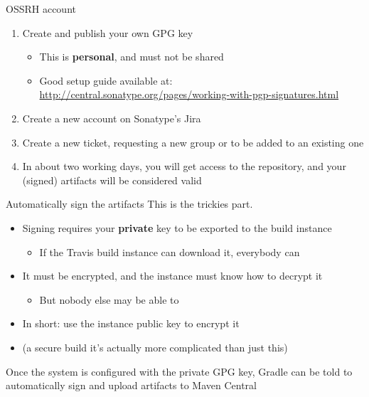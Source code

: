 \documentclass[presentation]{beamer}
\begin{document}
\begin{frame}[fragile]{OSSRH account}
	\begin{enumerate}
		\item Create and publish your own GPG key
		\begin{itemize}
			\item This is \textbf{personal}, and must not be shared
			\item Good setup guide available at: \\ \scriptsize{\url{http://central.sonatype.org/pages/working-with-pgp-signatures.html}}
		\end{itemize}
		\item Create a new account on Sonatype's Jira
		\item Create a new ticket, requesting a new group or to be added to an existing one
		\item In about two working days, you will get access to the repository, and your (signed) artifacts will be considered valid
	\end{enumerate}
\end{frame}

\begin{frame}[fragile]{Automatically sign the artifacts}
	This is the trickies part.
	\begin{itemize}
		\item Signing requires your \textbf{private} key to be exported to the build instance
		\begin{itemize}
			\item If the Travis build instance can download it, everybody can
		\end{itemize}
		\item It must be encrypted, and the instance must know how to decrypt it
		\begin{itemize}
			\item But nobody else may be able to
		\end{itemize}
		\item In short: use the instance public key to encrypt it 
		\item (a secure build it's actually more complicated than just this)
	\end{itemize}
	Once the system is configured with the private GPG key, Gradle can be told to automatically sign and upload artifacts to Maven Central
\end{frame}
\end{document}

